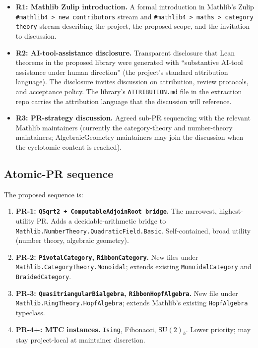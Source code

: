 \documentclass[11pt]{article}
\begin{document}
\begin{itemize}
\item \textbf{R1: Mathlib Zulip introduction.} A formal
introduction in Mathlib's Zulip
\texttt{\#mathlib4 > new contributors} stream and
\texttt{\#mathlib4 > maths > category theory} stream describing
the project, the proposed scope, and the invitation to discussion.
\item \textbf{R2: AI-tool-assistance disclosure.} Transparent
disclosure that Lean theorems in the proposed library were
generated with ``substantive AI-tool assistance under human
direction'' (the project's standard attribution language). The
disclosure invites discussion on attribution, review protocols,
and acceptance policy. The library's
\texttt{ATTRIBUTION.md} file in the extraction repo carries the
attribution language that the discussion will reference.
\item \textbf{R3: PR-strategy discussion.} Agreed sub-PR
sequencing with the relevant Mathlib maintainers (currently the
category-theory and number-theory maintainers; AlgebraicGeometry
maintainers may join the discussion when the cyclotomic content
is reached).
\end{itemize}

\subsection{Atomic-PR sequence}

The proposed sequence is:

\begin{enumerate}
\item \textbf{PR-1: \texttt{QSqrt2 + ComputableAdjoinRoot bridge}.}
The narrowest, highest-utility PR. Adds a decidable-arithmetic
bridge to \texttt{Mathlib.NumberTheory.QuadraticField.Basic}.
Self-contained, broad utility (number theory, algebraic geometry).
\item \textbf{PR-2: \texttt{PivotalCategory}, \texttt{RibbonCategory}.}
New files under \texttt{Mathlib.CategoryTheory.Monoidal}; extends
existing \texttt{MonoidalCategory} and \texttt{BraidedCategory}.
\item \textbf{PR-3: \texttt{QuasitriangularBialgebra},
\texttt{RibbonHopfAlgebra}.} New file under
\texttt{Mathlib.RingTheory.HopfAlgebra}; extends Mathlib's
existing \texttt{HopfAlgebra} typeclass.
\item \textbf{PR-4+: MTC instances.} \texttt{Ising}, Fibonacci,
$\mathrm{SU}(2)_k$. Lower priority; may stay project-local at
maintainer discretion.
\end{enumerate}
\end{document}
